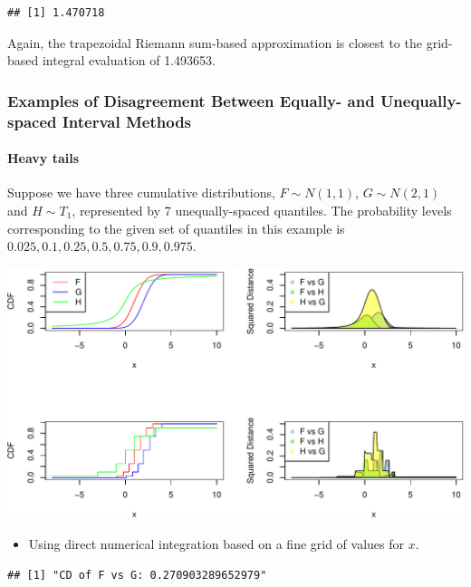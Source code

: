 \documentclass[
]{article}
\providecommand{\tightlist}{%
  \setlength{\itemsep}{0pt}\setlength{\parskip}{0pt}}
\begin{document}
\begin{verbatim}
## [1] 1.470718
\end{verbatim}

Again, the trapezoidal Riemann sum-based approximation is closest to the
grid-based integral evaluation of 1.493653.

\hypertarget{examples-of-disagreement-between-equally--and-unequally-spaced-interval-methods}{%
\subsubsection{Examples of Disagreement Between Equally- and
Unequally-spaced Interval
Methods}\label{examples-of-disagreement-between-equally--and-unequally-spaced-interval-methods}}

\hypertarget{heavy-tails}{%
\paragraph{Heavy tails}\label{heavy-tails}}

Suppose we have three cumulative distributions, \(F\sim N(1,1)\),
\(G\sim N(2,1)\) and \(H\sim T_1\), represented by 7 unequally-spaced
quantiles. The probability levels corresponding to the given set of
quantiles in this example is \(0.025,0.1,0.25,0.5,0.75,0.9,0.975\).

\includegraphics{cd_approx_2_files/figure-latex/unnamed-chunk-25-1.pdf}

\begin{itemize}
\tightlist
\item
  Using direct numerical integration based on a fine grid of values for
  \(x\).
\end{itemize}

\begin{verbatim}
## [1] "CD of F vs G: 0.270903289652979"
\end{verbatim}
\end{document}
